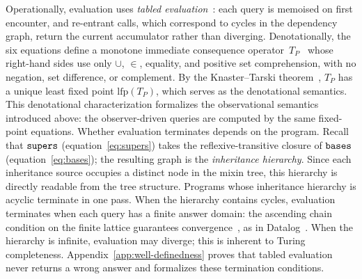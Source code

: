 Operationally, evaluation uses \emph{tabled
evaluation}~\cite{tamaki1986-tabled-resolution}:
each query is memoised on first encounter, and
re-entrant calls, which correspond to cycles in the dependency graph,
return the current accumulator rather than diverging.
Denotationally, the six equations define a monotone
immediate consequence
operator~$T_P$~\cite{vanemden1976-predicate-logic-semantics}
whose right-hand sides use only $\cup$, $\in$, equality, and
positive set comprehension, with no negation, set
difference, or complement.
By the Knaster--Tarski
theorem~\cite{tarski1955-lattice-fixpoint-theorem}, $T_P$ has a unique
least fixed point $\mathrm{lfp}(T_P)$, which serves as
the denotational semantics.
This denotational characterization formalizes the observational
semantics introduced above: the observer-driven queries are
computed by the same fixed-point equations.
Whether evaluation terminates depends on the program.
Recall that $\mathtt{supers}$ (equation~\ref{eq:supers}) takes the
reflexive-transitive closure of $\mathtt{bases}$
(equation~\ref{eq:bases}); the resulting graph is the
\emph{inheritance hierarchy}.
Since each inheritance source occupies a distinct node in
the mixin tree, this hierarchy is directly readable from
the tree structure.
Programs whose inheritance hierarchy is acyclic terminate in
one pass.
When the hierarchy contains cycles,
evaluation terminates when each query has a finite
answer domain: the ascending chain condition on the finite
lattice guarantees
convergence~\cite{bancilhon1986-recursive-query-strategies},
as in Datalog~\cite{vanemden1976-predicate-logic-semantics}.
When the hierarchy is infinite, evaluation may
diverge; this is inherent to Turing completeness.
Appendix~\ref{app:well-definedness} proves that tabled
evaluation never returns a wrong answer and formalizes
these termination conditions.

